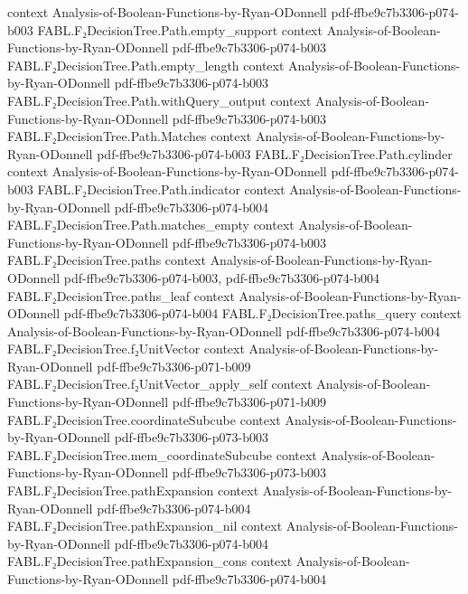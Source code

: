 \begin{theorem}
  {context}
  {Analysis-of-Boolean-Functions-by-Ryan-ODonnell}
  {pdf-ffbe9c7b3306-p074-b003}
\proofstep
  {FABL.F₂DecisionTree.Path.empty_support}
  {context}
  {Analysis-of-Boolean-Functions-by-Ryan-ODonnell}
  {pdf-ffbe9c7b3306-p074-b003}
\proofstep
  {FABL.F₂DecisionTree.Path.empty_length}
  {context}
  {Analysis-of-Boolean-Functions-by-Ryan-ODonnell}
  {pdf-ffbe9c7b3306-p074-b003}
\proofstep
  {FABL.F₂DecisionTree.Path.withQuery_output}
  {context}
  {Analysis-of-Boolean-Functions-by-Ryan-ODonnell}
  {pdf-ffbe9c7b3306-p074-b003}
\proofstep
  {FABL.F₂DecisionTree.Path.Matches}
  {context}
  {Analysis-of-Boolean-Functions-by-Ryan-ODonnell}
  {pdf-ffbe9c7b3306-p074-b003}
\proofstep
  {FABL.F₂DecisionTree.Path.cylinder}
  {context}
  {Analysis-of-Boolean-Functions-by-Ryan-ODonnell}
  {pdf-ffbe9c7b3306-p074-b003}
\proofstep
  {FABL.F₂DecisionTree.Path.indicator}
  {context}
  {Analysis-of-Boolean-Functions-by-Ryan-ODonnell}
  {pdf-ffbe9c7b3306-p074-b004}
\proofstep
  {FABL.F₂DecisionTree.Path.matches_empty}
  {context}
  {Analysis-of-Boolean-Functions-by-Ryan-ODonnell}
  {pdf-ffbe9c7b3306-p074-b003}
\proofstep
  {FABL.F₂DecisionTree.paths}
  {context}
  {Analysis-of-Boolean-Functions-by-Ryan-ODonnell}
  {pdf-ffbe9c7b3306-p074-b003,
    pdf-ffbe9c7b3306-p074-b004}
\proofstep
  {FABL.F₂DecisionTree.paths_leaf}
  {context}
  {Analysis-of-Boolean-Functions-by-Ryan-ODonnell}
  {pdf-ffbe9c7b3306-p074-b004}
\proofstep
  {FABL.F₂DecisionTree.paths_query}
  {context}
  {Analysis-of-Boolean-Functions-by-Ryan-ODonnell}
  {pdf-ffbe9c7b3306-p074-b004}
\proofstep
  {FABL.F₂DecisionTree.f₂UnitVector}
  {context}
  {Analysis-of-Boolean-Functions-by-Ryan-ODonnell}
  {pdf-ffbe9c7b3306-p071-b009}
\proofstep
  {FABL.F₂DecisionTree.f₂UnitVector_apply_self}
  {context}
  {Analysis-of-Boolean-Functions-by-Ryan-ODonnell}
  {pdf-ffbe9c7b3306-p071-b009}
\proofstep
  {FABL.F₂DecisionTree.coordinateSubcube}
  {context}
  {Analysis-of-Boolean-Functions-by-Ryan-ODonnell}
  {pdf-ffbe9c7b3306-p073-b003}
\proofstep
  {FABL.F₂DecisionTree.mem_coordinateSubcube}
  {context}
  {Analysis-of-Boolean-Functions-by-Ryan-ODonnell}
  {pdf-ffbe9c7b3306-p073-b003}
\proofstep
  {FABL.F₂DecisionTree.pathExpansion}
  {context}
  {Analysis-of-Boolean-Functions-by-Ryan-ODonnell}
  {pdf-ffbe9c7b3306-p074-b004}
\proofstep
  {FABL.F₂DecisionTree.pathExpansion_nil}
  {context}
  {Analysis-of-Boolean-Functions-by-Ryan-ODonnell}
  {pdf-ffbe9c7b3306-p074-b004}
\proofstep
  {FABL.F₂DecisionTree.pathExpansion_cons}
  {context}
  {Analysis-of-Boolean-Functions-by-Ryan-ODonnell}
  {pdf-ffbe9c7b3306-p074-b004}
\proofstep

\end{theorem}
